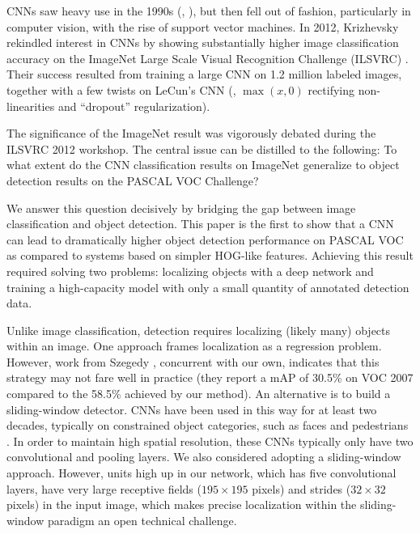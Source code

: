 CNNs saw heavy use in the 1990s (\eg, \cite{lecun-98}), but then fell out of fashion, particularly in computer vision, with the rise of support vector machines.
In 2012, Krizhevsky \etal \cite{krizhevsky2012imagenet} rekindled interest
in CNNs by showing substantially higher image classification accuracy on the ImageNet Large Scale Visual Recognition Challenge (ILSVRC) \cite{ILSVRC12,imagenet_cvpr09}.
Their success resulted from training a large CNN on 1.2 million labeled images, together with a few twists on LeCun's CNN (\eg, $\max(x,0)$ rectifying non-linearities and ``dropout'' regularization).

The significance of the ImageNet result was vigorously debated during the ILSVRC 2012 workshop.
The central issue can be distilled to the following: To what
extent do the CNN classification results on ImageNet generalize
to object detection results on the PASCAL VOC Challenge?

We answer this question decisively by bridging the gap between image classification and object detection.
This paper is the first to show that a CNN can lead to dramatically higher object detection performance on PASCAL VOC as compared to systems based on simpler HOG-like features.
Achieving this result required solving two problems: localizing objects with a deep network and training a high-capacity model with only a small quantity of annotated detection data.

Unlike image classification, detection requires localizing (likely many) objects within an image.
One approach frames localization as a regression problem.
However, work from Szegedy \etal \cite{szegedy2013deep}, concurrent with our own, 
indicates that this strategy may not fare well in practice (they report a mAP of 30.5\% on VOC 2007 compared to the 58.5\% achieved by our method).
An alternative is to build a sliding-window detector.
CNNs have been used in this way for at least two decades, typically on constrained object categories, such as faces \cite{rowley1998neural,lecun94} and pedestrians \cite{sermanetCVPR13}.
In order to maintain high spatial resolution, these CNNs typically only have two convolutional and pooling layers.
We also considered adopting a sliding-window approach.
However, units high up in our network, which has five convolutional layers, have very large receptive fields ($195 \times 195$ pixels) and strides ($32 \times 32$ pixels) in the input image, which makes precise localization within the sliding-window paradigm an open technical challenge.

